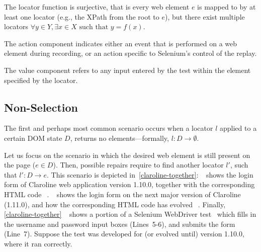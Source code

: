 The locator function is surjective, that is every web element $e$ is mapped to by at least one locator (e.g., the XPath from the root to $e$), but there exist multiple locators {$\displaystyle \forall y\in Y,\exists x\in X{\text{ such that }}y=f(x).$} 

\begin{defn}
The action component indicates either an event that is performed
on a web element during recording, or an action specific to Selenium's control of the replay.
\end{defn}

\begin{defn} The value component refers to any input entered by the test within the element specified by the locator.
\end{defn}

\subsection{Non-Selection}\label{sec:nonselection}

The first and perhaps most common scenario occurs when a locator $l$ applied to a certain DOM state $D$, returns no elements---formally, $l: D \rightarrow \emptyset$. 
%

Let us focus on the scenario in which the desired web element is still present on the page ($e \in D$). 
Then, possible repairs require to find another locator $l'$, such that $l': D \rightarrow e$.
This scenario is depicted in~\autoref{claroline-together}: \textcircled{}~shows the login form of Claroline web application version 1.10.0, together with the corresponding HTML code~\textcircled{}. \textcircled{}~shows the login form on the next major version of Claroline (1.11.0), and how the corresponding HTML code has evolved~\textcircled{}. 
Finally, \autoref{claroline-together}~\textcircled{} shows a portion of a Selenium WebDriver test~\cite{selenium} which 
fills in the username and password input boxes (Lines~5-6), and submits the form (Line~7). Suppose the test was developed for (or evolved until) version 1.10.0, where it ran correctly.

